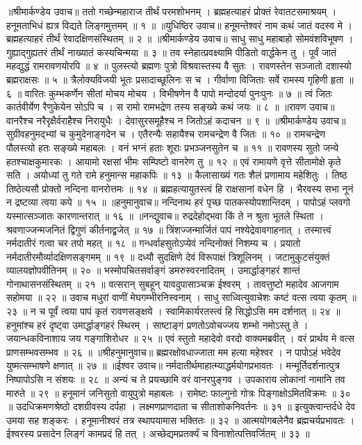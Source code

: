 ॥श्रीमार्कण्डेय उवाच॥
ततो गच्छेन्महाराज तीर्थं परमशोभनम् ।
ब्रह्महत्याहरं प्रोक्तं रेवातटसमाश्रयम् ।
हनूमताभिधं ह्यत्र विद्यते लिङ्गमुत्तमम् ॥ १ ॥
॥युधिष्ठिर उवाच॥
हनूमन्तेश्वरं नाम कथं जातं वदस्व मे ।
ब्रह्महत्याहरं तीर्थं रेवादक्षिणसंस्थितम् ॥ २ ॥
॥श्रीमार्कण्डेय उवाच॥
साधु साधु महाबाहो सोमवंशविभूषण ।
गुह्याद्गुह्यतरं तीर्थं नाख्यातं कस्यचिन्मया ॥ ३ ॥
तव स्नेहात्प्रवक्ष्यामि पीडितो वार्द्धकेन तु ।
पूर्वं जातं महद्युद्धं रामरावणयोरपि ॥ ४ ॥
पुलस्त्यो ब्रह्मणः पुत्रो विश्रवास्तस्य वै सुतः ।
रावणस्तेन सञ्जातो दशास्यो ब्रह्मराक्षसः ॥ ५ ॥
त्रैलोक्यविजयी भूतः प्रसादाच्छूलिनः स च ।
गीर्वाणा विजिताः सर्वे रामस्य गृहिणी हृता ॥ ६ ॥
वारितः कुम्भकर्णेन सीतां मोचय मोचय ।
विभीषणेन वै पापो मन्दोदर्या पुनःपुनः ॥ ७ ॥
त्वं जितः कार्तवीर्येण रैणुकेयेन सोऽपि च ।
स रामो रामभद्रेण तस्य सङ्ख्ये कथं जयः ॥ ८ ॥
॥रावण उवाच॥
वानरैश्च नरैरृक्षैर्वराहैश्च निरायुधैः ।
देवासुरसमूहैश्च न जितोऽहं कदाचन ॥ ९ ॥
॥श्रीमार्कण्डेय उवाच॥
सुग्रीवहनुमद्भ्यां च कुमुदेनाङ्गदेन च ।
एतैरन्यैः सहायैश्च रामचन्द्रेण वै जितः ॥ १० ॥
रामचन्द्रेण पौलस्त्यो हतः सङ्ख्ये महाबलः ।
वनं भग्नं हताः शूराः प्रभञ्जनसुतेन च ॥ ११ ॥
रावणस्य सुतो जन्ये हतश्चाक्षकुमारकः ।
आयामो रक्षसां भीमः सम्पिष्टो वानरेण तु ॥ १२ ॥
एवं रामायणे वृत्ते सीतामोक्षे कृते सति ।
अयोध्यां तु गते रामे हनुमान्स महाकपिः ॥ १३ ॥
कैलासाख्यं गतः शैलं प्रणामाय महेशितुः ।
तिष्ठ तिष्ठेत्यसौ प्रोक्तो नन्दिना वानरोत्तमः ॥ १४ ॥
ब्रह्महत्यायुतस्त्वं हि राक्षसानां वधेन हि ।
भैरवस्य सभा नूनं न द्रष्टव्या त्वया कपे ॥ १५ ॥
॥हनुमानुवाच॥
नन्दिनाथ हरं पृच्छ पातकस्योपशान्तिदम् ।
पापोऽहं प्लवगो यस्मात्सञ्जातः कारणान्तरात् ॥ १६ ॥
॥नन्द्युवाच॥
रुद्रदेहोद्भवा किं ते न श्रुता भूतले स्थिता ।
श्रवणाज्जन्मजनितं द्विगुणं कीर्तनाद्व्रजेत् ॥ १७ ॥
त्रिंशज्जन्मार्जितं पापं नश्येद्रेवावगाहनात् ।
तस्मात्त्वं नर्मदातीरं गत्वा चर तपो महत् ॥ १८ ॥
गन्धर्वाहसुतोऽप्येवं नन्दिनोक्तं निशम्य च ।
प्रयातो नर्मदातीरमौर्व्यादक्षिणसङ्गमम् ॥ १९ ॥
दध्यौ सुदक्षिणे देवं विरूपाक्षं त्रिशूलिनम् ।
जटामुकुटसंयुक्तं व्यालयज्ञोपवीतिनम् ॥ २० ॥
भस्मोपचितसर्वाङ्गं डमरुस्वरनादितम् ।
उमार्द्धाङ्गहरं शान्तं गोनाथासनसंस्थितम् ॥ २१ ॥
वत्सरान् सुबहून् यावदुपासाञ्चक्र ईश्वरम् ।
तावत्तुष्टो महादेव आजगाम सहोमया ॥ २२ ॥
उवाच मधुरां वाणीं मेघगम्भीरनिस्वनाम् ।
साधु साध्वित्युवाचेशः कष्टं वत्स त्वया कृतम् ॥ २३ ॥
न च पूर्वं त्वया पापं कृतं रावणसङ्क्षये ।
स्वामिकार्यरतस्त्वं हि सिद्धोऽसि मम दर्शनात् ॥ २४ ॥
हनुमांश्च हरं दृष्ट्वा उमार्द्धाङ्गहरं स्थिरम् ।
साष्टाङ्गं प्रणतोऽवोचज्जय शम्भो नमोऽस्तु ते ।
जयान्धकविनाशाय जय गङ्गाशिरोधर ॥ २५ ॥
एवं स्तुतो महादेवो वरदो वाक्यमब्रवीत् ।
वरं प्रार्थय मे वत्स प्राणसम्भवसम्भव ॥ २६ ॥
॥श्रीहनुमानुवाच॥
ब्रह्मरक्षोवधाज्जाता मम हत्या महेश्वर ।
न पापोऽहं भवेदेव युष्मत्सम्भाषणे क्षणात् ॥ २७ ॥
॥ईश्वर उवाच॥
नर्मदातीर्थमाहात्म्याद्धर्मयोगप्रभावतः ।
मन्मूर्तिदर्शनात्पुत्र निष्पापोऽसि न संशयः ॥ २८ ॥
अन्यं च ते प्रयच्छामि वरं वानरपुङ्गव ।
उपकाराय लोकानां नामानि तव मारुते ॥ २९ ॥
हनूमानं जनिसुतो वायुपुत्रो महाबलः ।
रामेष्टः फाल्गुनो गोत्रः पिङ्गाक्षोऽमितविक्रमः ॥ ३० ॥
उदधिक्रमणश्रेष्ठो दशग्रीवस्य दर्पहा ।
लक्ष्मणप्राणदाता च सीताशोकनिवर्तनः ॥ ३१ ॥
इत्युक्त्वान्तर्दधे देव उमया सह शङ्करः ।
हनूमानीश्वरं तत्र स्थापयामास भक्तितः ॥ ३२ ॥
आत्मयोगबलेनैव ब्रह्मचर्यप्रभावतः ।
ईश्वरस्य प्रसादेन लिङ्गं कामप्रदं हि तत् ।
अच्छेद्यमप्रतर्क्यं च विनाशोत्पत्तिवर्जितम् ॥ ३३ ॥

